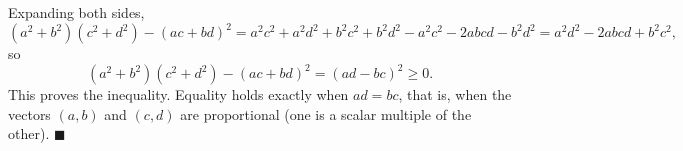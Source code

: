 Expanding both sides,
\[(a^2+b^2)(c^2+d^2)-(ac+bd)^2=a^2c^2+a^2d^2+b^2c^2+b^2d^2-a^2c^2-2abcd-b^2d^2=a^2d^2-2abcd+b^2c^2,\]
so
\[(a^2+b^2)(c^2+d^2)-(ac+bd)^2=(ad-bc)^2\ge0 .\]
This proves the inequality. Equality holds exactly when $ad=bc$, that is, when the vectors $(a,b)$ and $(c,d)$ are proportional (one is a scalar multiple of the other). $\blacksquare$
